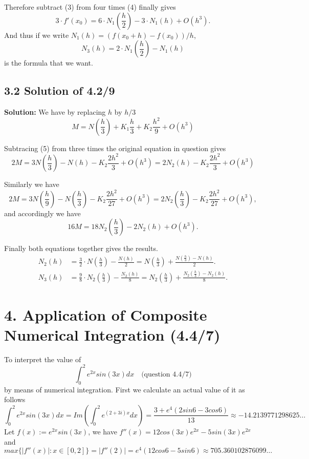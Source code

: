 \documentclass{article}
\begin{document}
    Therefore subtract (3) from four times (4) finally gives
    $$
    3\cdot f'(x_{0})=6\cdot N_{1}(\frac{h}{2})-3\cdot N_{1}(h)+O(h^3).
    $$
    And thus if we write $N_{1}(h)=(f(x_{0}+h)-f(x_{0}))/h$,
    $$N_{3}(h)=2\cdot N_{1}(\frac{h}{2})-N_{1}(h)$$
    is the formula that we want.

\subsection{3.2 Solution of 4.2/9}
\noindent\textbf{Solution:}
    We have by replacing $h$ by $h/3$
    \begin{equation}
    M=N(\frac{h}{3})+K_{1}\frac{h}{3}+K_{2}\frac{h^2}{9}+O(h^3)
    \end{equation}

    Subtracing (5) from three times the original equation in question gives  
    \begin{equation}
    2M=3N(\frac{h}{3})-N(h)-K_{2}\frac{2h^2}{3}+O(h^3)=2N_{2}(h)-K_{2}\frac{2h^2}{3}+O(h^3)
    \end{equation}

    Similarly we have 
    \begin{equation}
    2M=3N(\frac{h}{9})-N(\frac{h}{3})-K_{2}\frac{2h^2}{27}+O(h^3)=2N_{2}(\frac{h}{3})-K_{2}\frac{2h^2}{27}+O(h^3),
    \end{equation}
    and accordingly we have
    \begin{equation}
    16M=18N_{2}(\frac{h}{3})-2N_{2}(h)+O(h^3).
    \end{equation}

    Finally both equations together gives the results.
    \begin{align*}
    N_{2}(h)&=\frac{3}{2}\cdot N(\frac{h}{3})-\frac{N(h)}{2}=N(\frac{h}{3})+\frac{N(\frac{h}{3})-N(h)}{2}.\\
    N_{3}(h)&=\frac{9}{8}\cdot N_{2}(\frac{h}{3})-\frac{N_{2}(h)}{8}=N_{2}(\frac{h}{3})+\frac{N_{2}(\frac{h}{3})-N_{2}(h)}{8}.
    \end{align*}

\section{4. Application of Composite Numerical Integration (4.4/7)}
    To interpret the value of 
    $$\int_{0}^{2}e^{2x}sin(3x)dx \quad \text{(question 4.4/7)}
    $$
    by means of numerical integration. First we calculate an actual value of it as follows
    $$ \int_{0}^{2}e^{2x}sin(3x)dx=Im(\int_{0}^{2}e^{(2+3i)x}dx)=\frac{3+e^4(2sin6-3cos6)}{13}\approx -14.2139771298625\ldots
    $$
    Let $f(x):=e^{2x}sin(3x)$, we have $f''(x)=12cos(3x)e^{2x}-5sin(3x)e^{2x}$ and 
    $$ max\{|f''(x)|:x\in[0,2]\}=|f''(2)|=e^4(12cos6-5sin6)\approx705.360102876099\ldots
    $$
\end{document}
